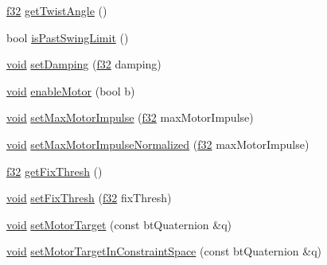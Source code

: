 \begin{DoxyCompactItemize}
\item 
\mbox{\hyperlink{_util_8h_a5f6906312a689f27d70e9d086649d3fd}{f32}} \mbox{\hyperlink{classnjli_1_1_physics_constraint_cone_twist_a456096ba5a6602c65e1cfdacd2e155ad}{get\+Twist\+Angle}} ()
\item 
bool \mbox{\hyperlink{classnjli_1_1_physics_constraint_cone_twist_aa88ef9a706160dba1e9805171bfcbd43}{is\+Past\+Swing\+Limit}} ()
\item 
\mbox{\hyperlink{_thread_8h_af1e856da2e658414cb2456cb6f7ebc66}{void}} \mbox{\hyperlink{classnjli_1_1_physics_constraint_cone_twist_a9552eedd807cd2833d584d0ccbf74f91}{set\+Damping}} (\mbox{\hyperlink{_util_8h_a5f6906312a689f27d70e9d086649d3fd}{f32}} damping)
\item 
\mbox{\hyperlink{_thread_8h_af1e856da2e658414cb2456cb6f7ebc66}{void}} \mbox{\hyperlink{classnjli_1_1_physics_constraint_cone_twist_a7903e56124cef31df66e81467f4fd597}{enable\+Motor}} (bool b)
\item 
\mbox{\hyperlink{_thread_8h_af1e856da2e658414cb2456cb6f7ebc66}{void}} \mbox{\hyperlink{classnjli_1_1_physics_constraint_cone_twist_ad80eeca857c3ba2977181a2db59ea185}{set\+Max\+Motor\+Impulse}} (\mbox{\hyperlink{_util_8h_a5f6906312a689f27d70e9d086649d3fd}{f32}} max\+Motor\+Impulse)
\item 
\mbox{\hyperlink{_thread_8h_af1e856da2e658414cb2456cb6f7ebc66}{void}} \mbox{\hyperlink{classnjli_1_1_physics_constraint_cone_twist_a6c0ffec35cf8e2d669f7333c1d889a21}{set\+Max\+Motor\+Impulse\+Normalized}} (\mbox{\hyperlink{_util_8h_a5f6906312a689f27d70e9d086649d3fd}{f32}} max\+Motor\+Impulse)
\item 
\mbox{\hyperlink{_util_8h_a5f6906312a689f27d70e9d086649d3fd}{f32}} \mbox{\hyperlink{classnjli_1_1_physics_constraint_cone_twist_a86bb590a043c9e7604e144081a86ee0d}{get\+Fix\+Thresh}} ()
\item 
\mbox{\hyperlink{_thread_8h_af1e856da2e658414cb2456cb6f7ebc66}{void}} \mbox{\hyperlink{classnjli_1_1_physics_constraint_cone_twist_a0bfeee1933ef308fc523f58421dcb9a2}{set\+Fix\+Thresh}} (\mbox{\hyperlink{_util_8h_a5f6906312a689f27d70e9d086649d3fd}{f32}} fix\+Thresh)
\item 
\mbox{\hyperlink{_thread_8h_af1e856da2e658414cb2456cb6f7ebc66}{void}} \mbox{\hyperlink{classnjli_1_1_physics_constraint_cone_twist_aa9330c775b1d77026c0b3b23d8750bab}{set\+Motor\+Target}} (const bt\+Quaternion \&q)
\item 
\mbox{\hyperlink{_thread_8h_af1e856da2e658414cb2456cb6f7ebc66}{void}} \mbox{\hyperlink{classnjli_1_1_physics_constraint_cone_twist_a8e8f494383a0db257761c61924481232}{set\+Motor\+Target\+In\+Constraint\+Space}} (const bt\+Quaternion \&q)

\end{DoxyCompactItemize}
